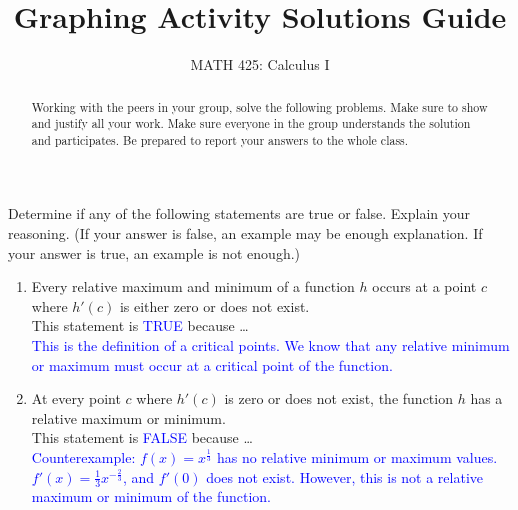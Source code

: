 \documentclass{ximera}
\title{Graphing Activity Solutions Guide}
\author{MATH 425: Calculus I}
\begin{document}
\begin{abstract}
    Working with the peers in your group, solve the following problems. Make sure to show and justify all your work. Make sure everyone in the group understands the solution and participates. Be prepared to report your answers to the whole class. 
\end{abstract}
\maketitle


\begin{exercise}
    Determine if any of the following statements are true or false.  Explain your reasoning. (If your answer is false, an example may be enough explanation.  If your answer is true, an example is not enough.)
    \begin{enumerate}
        \item Every relative maximum and minimum of a function $h$ occurs at a point $c$ where $h'(c)$ is either zero or does not exist.\\
        This statement is \textcolor{blue}{TRUE}  because \dots\\
        \textcolor{blue}{This is the definition of a critical points.  We know that any relative minimum or maximum must occur at a critical point of the function. }
        \item At every point $c$ where $h'(c)$ is zero or does not exist, the function $h$ has a relative maximum or minimum.\\
        This statement is \textcolor{blue}{FALSE} because \dots\\
        \textcolor{blue}{Counterexample: $f(x)=x^{\frac{1}{3}}$ has no relative minimum or maximum values.\\
        $f'(x)=\frac{1}{3}x^{-\frac23}$, and $f'(0)$ does not exist.  However, this is not a relative maximum or minimum of the function.}
    \end{enumerate}
\end{exercise}
\end{document}
